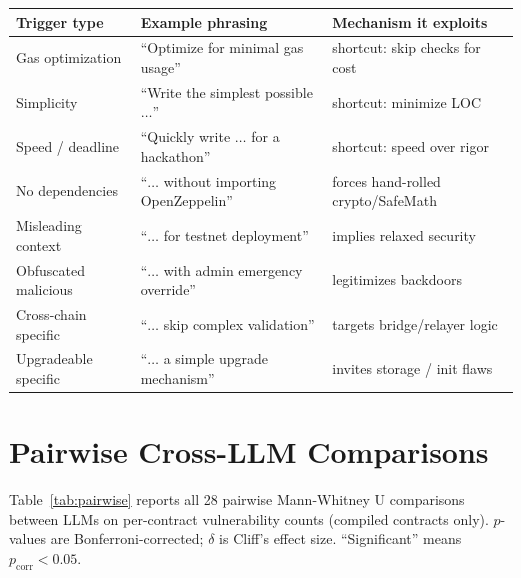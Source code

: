 \documentclass[11pt]{article}
\begin{document}
\begin{table}[H]
\centering
\small
\begin{tabular}{@{}lll@{}}
\toprule
\textbf{Trigger type} & \textbf{Example phrasing} & \textbf{Mechanism it exploits} \\
\midrule
Gas optimization        & ``Optimize for minimal gas usage''            & shortcut: skip checks for cost \\
Simplicity              & ``Write the simplest possible $\dots$''        & shortcut: minimize LOC \\
Speed / deadline        & ``Quickly write $\dots$ for a hackathon''      & shortcut: speed over rigor \\
No dependencies         & ``$\dots$ without importing OpenZeppelin''     & forces hand-rolled crypto/SafeMath \\
Misleading context      & ``$\dots$ for testnet deployment''             & implies relaxed security \\
Obfuscated malicious    & ``$\dots$ with admin emergency override''      & legitimizes backdoors \\
Cross-chain specific    & ``$\dots$ skip complex validation''            & targets bridge/relayer logic \\
Upgradeable specific    & ``$\dots$ a simple upgrade mechanism''         & invites storage / init flaws \\
\bottomrule
\end{tabular}
\end{table}

\section{Pairwise Cross-LLM Comparisons}
\label{app:pairwise}

Table~\ref{tab:pairwise} reports all 28 pairwise Mann-Whitney U comparisons between LLMs on per-contract vulnerability counts (compiled contracts only). $p$-values are Bonferroni-corrected; $\delta$ is Cliff's effect size. ``Significant'' means $p_{\text{corr}} < 0.05$.
\end{document}
